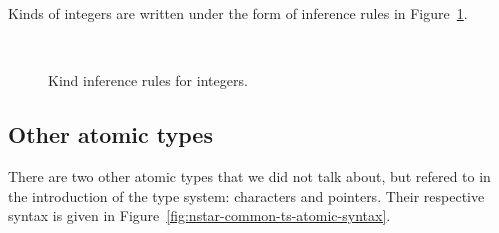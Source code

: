 Kinds of integers are written under the form of inference rules in Figure~\ref{fig:nstar-common-ts-integer-kindrules}.

\begin{figure}[htb]
  \centering

  \begin{prooftree}
  \end{prooftree}
  \hspace{3em}
  \begin{prooftree}
  \end{prooftree}
  \hspace{3em}
  \begin{prooftree}
  \end{prooftree}
  \hspace{3em}
  \begin{prooftree}
  \end{prooftree}
  \\\vspace{\baselineskip}
  \begin{prooftree}
  \end{prooftree}
  \hspace{3em}
  \begin{prooftree}
  \end{prooftree}
  \hspace{3em}
  \begin{prooftree}
  \end{prooftree}
  \hspace{3em}
  \begin{prooftree}
  \end{prooftree}

  \caption{Kind inference rules for integers.}
  \label{fig:nstar-common-ts-integer-kindrules}
\end{figure}

\subsection{Other atomic types}\label{subsec:nstar-common-ts-otheratomic}

There are two other atomic types that we did not talk about, but refered to in the introduction of the type system: characters and pointers. Their respective syntax is given in Figure~\ref{fig:nstar-common-ts-atomic-syntax}.

